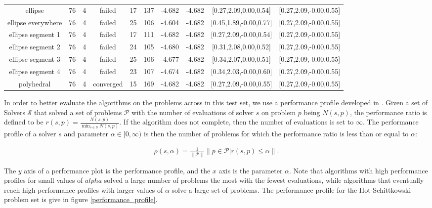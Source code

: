 \begin{tiny}
\begin{center}
\begin{tabular}{ c c c c c c c c c c }
         ellipse          &   76  &  4  &   failed   &   17  &  137  &   -4.682   &   -4.682   & [0.27,2.09,0.00,0.54] & [0.27,2.09,-0.00,0.55] \\
    ellipse everywhere    &   76  &  4  &   failed   &   25  &  106  &   -4.604   &   -4.682   & [0.45,1.89,-0.00,0.77] & [0.27,2.09,-0.00,0.55] \\
    ellipse segment 1     &   76  &  4  &   failed   &   17  &  111  &   -4.682   &   -4.682   & [0.27,2.09,-0.00,0.54] & [0.27,2.09,-0.00,0.55] \\
    ellipse segment 2     &   76  &  4  &   failed   &   24  &  105  &   -4.680   &   -4.682   & [0.31,2.08,0.00,0.52] & [0.27,2.09,-0.00,0.55] \\
    ellipse segment 3     &   76  &  4  &   failed   &   25  &  106  &   -4.677   &   -4.682   & [0.34,2.07,0.00,0.51] & [0.27,2.09,-0.00,0.55] \\
    ellipse segment 4     &   76  &  4  &   failed   &   23  &  107  &   -4.674   &   -4.682   & [0.34,2.03,-0.00,0.60] & [0.27,2.09,-0.00,0.55] \\
        polyhedral        &   76  &  4  & converged  &   15  &  169  &   -4.682   &   -4.682   & [0.27,2.09,-0.00,0.55] & [0.27,2.09,-0.00,0.55]
\end{tabular}
\end{center}


\end{tiny}

In order to better evaluate the algorithms on the problems across in this test set, we use a performance profile developed in \cite{More:2009:BDO:1654367.1654371}.
Given a set of Solvers $\mathcal S$ that solved a set of problems $\mathcal P$ with the number of evaluations of solver $s$ on problem $p$ being $N(s, p)$, the performance ratio is defined to be $r(s, p) = \frac{N(s, p)}{\min_{s \in \mathcal S} N(s, p)}$.
If the algorithm does not complete, then the number of evaluations is set to $\infty$.
The performance profile of a solver $s$ and parameter $\alpha \in [0, \infty)$ is then the number of problems for which the performance ratio is less than or equal to $\alpha$: 

\begin{align}
\rho(s, \alpha) = \frac 1 {\|\mathcal P \|} \|p \in \mathcal P | r(s, p) \le \alpha\|.
\end{align}

The $y$ axis of a performance plot is the performance profile, and the $x$ axis is the parameter $\alpha$.
Note that algorithms with high performance profiles for small values of $alpha$ solved a large number of problems the most with the fewest evaluations, while algorithms that eventually reach high performance profiles with larger values of $\alpha$ solve a large set of problems.
The performance profile for the Hot-Schittkowski problem set is give in figure \cref{performance_profile}.


